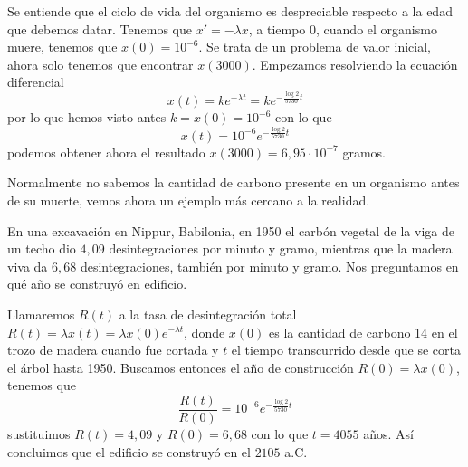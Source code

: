 \documentclass[../main.tex]{subfiles}
\begin{document}
\begin{solution}
	Se entiende que el ciclo de vida del organismo
	es despreciable respecto a la edad que debemos datar. Tenemos que 
	\(x' = -\lambda x\), a tiempo \(0\), cuando el organismo muere, tenemos que
	\(x(0) = 10^{-6}\). Se trata de un problema de valor inicial, ahora solo tenemos
	que encontrar \(x(3000)\). Empezamos resolviendo la ecuación diferencial
	\[x(t) = k e^{-\lambda t} = k e^{-\frac{\log 2}{5730} t}\]
	por lo que hemos visto antes \(k = x(0) = 10^{-6}\) con lo que
	\[x(t) = 10^{-6} e^{-\frac{\log 2}{5730} t}\]
	podemos obtener ahora el resultado \(x(3000) = 6,95 \cdot 10^{-7}\) gramos.
\end{solution}

Normalmente no sabemos la cantidad de carbono presente en un organismo antes de
su muerte, vemos ahora un ejemplo más cercano a la realidad. 

\begin{example}
	En una excavación en Nippur, Babilonia, en 1950 el carbón vegetal de la viga
	de un techo dio \(4,09\) desintegraciones por minuto y gramo, mientras que 
	la madera viva da \(6,68\) desintegraciones, también por minuto y gramo. 
	Nos preguntamos en qué año se construyó en edificio.
\end{example}

\begin{solution}
	Llamaremos \(R(t)\) a la tasa de desintegración total
	\(R(t) = \lambda x(t) = \lambda x(0) e^{-\lambda t}\), donde \(x(0)\) es la
	cantidad de carbono 14 en el trozo de madera cuando fue cortada y \(t\) el 
	tiempo transcurrido desde que se corta el árbol hasta 1950. Buscamos entonces
	el año de construcción \(R(0) = \lambda x(0)\), tenemos que
	\[\frac{R(t)}{R(0)} = 10^{-6} e^{-\frac{\log 2}{5730} t}\]
	sustituimos \(R(t) = 4,09\) y \(R(0) = 6,68\) con lo que \(t = 4055\) años. Así
	concluimos que el edificio se construyó en el \(2105\) a.C.
\end{solution}
\end{document}
